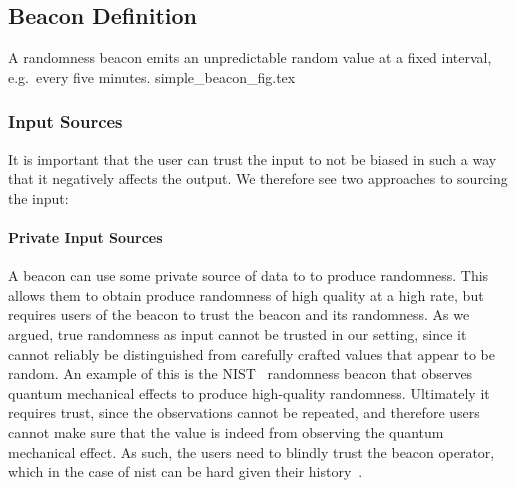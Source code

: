 

\subsection{Beacon Definition}

A randomness beacon emits an unpredictable random value at a fixed interval, e.g.\ every five minutes.
{simple_beacon_fig.tex}

\subsubsection{Input Sources}
It is important that the user can trust the input to not be biased in such a way that it negatively affects the output. We therefore see two approaches to sourcing the input:

\paragraph{Private Input Sources} A beacon can use some private source of data to to produce randomness. This allows them to obtain produce randomness of high quality at a high rate, but requires users of the beacon to trust the beacon and its randomness.
As we argued, true randomness as input cannot be trusted in our setting, since it cannot reliably be distinguished from carefully crafted values that appear to be random.
An example of this is the NIST~\cite{nistbeacon} randomness beacon that observes quantum mechanical effects to produce high-quality randomness.
Ultimately it requires trust, since the observations cannot be repeated, and therefore users cannot make sure that the value is indeed from observing the quantum mechanical effect.
As such, the users need to blindly trust the beacon operator, which in the case of \gls{nist} can be hard given their history~\cite{nytimes-nsabackdoors, nytimes-nsaconstants, nist2014backdoor}.



